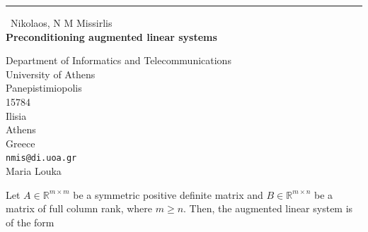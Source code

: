 \documentclass{report}
\begin{document}
\begin{center}
\rule{6in}{1pt} \
{\large Nikolaos, N M Missirlis \\
{\bf Preconditioning augmented linear systems}}

Department of Informatics and Telecommunications \\ University of Athens \\ Panepistimiopolis \\ 15784 \\ Ilisia \\ Athens \\ Greece
\\
{\tt nmis@di.uoa.gr}\\
Maria Louka\end{center}



Let $A \in \mathbb{R}^{m\times m}$ be a symmetric positive definite
matrix and $B\in\mathbb{R}^{m\times n}$ be a matrix of full column rank,
where $m\geq n$. Then, the augmented linear system is of the form
\end{document}
